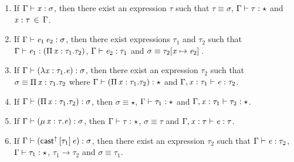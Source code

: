 \begin{lem}\label{lem:appendix:gen}
$\quad$
\begin{enumerate}[(1)]
	\item If $\Gamma  \vdash  \mathit{x}  :  \sigma$, then there exist an expression $\tau$ such that $\tau  \equiv  \sigma$, $\Gamma  \vdash  \tau  :  \star$ and $\mathit{x}  :  \tau \, \in \, \Gamma$.
	\item If $\Gamma  \vdash  \mathit{e_{{\mathrm{1}}}} \, \mathit{e_{{\mathrm{2}}}}  :  \sigma$, then there exist expressions $\tau_{{\mathrm{1}}}$ and $\tau_{{\mathrm{2}}}$ such that $\Gamma  \vdash  \mathit{e_{{\mathrm{1}}}}  :  (  \Pi \, \mathit{x}  :  \tau_{{\mathrm{1}}}  .  \tau_{{\mathrm{2}}}  )$, $\Gamma  \vdash  \mathit{e_{{\mathrm{2}}}}  :  \tau_{{\mathrm{1}}}$ and $\sigma  \equiv  \tau_{{\mathrm{2}}}  [  \mathit{x}  \mapsto  \mathit{e_{{\mathrm{2}}}}  ] \,$.
	\item If $\Gamma  \vdash  (  \lambda  \mathit{x}  :  \tau_{{\mathrm{1}}}  .  \mathit{e}  )  :  \sigma$, then there exist an expression $\tau_{{\mathrm{2}}}$ such that $\sigma  \equiv  \Pi \, \mathit{x}  :  \tau_{{\mathrm{1}}}  .  \tau_{{\mathrm{2}}}$ where $\Gamma  \vdash  (  \Pi \, \mathit{x}  :  \tau_{{\mathrm{1}}}  .  \tau_{{\mathrm{2}}}  )  :  \star$ and $\Gamma  ,  \mathit{x}  :  \tau_{{\mathrm{1}}}  \vdash  \mathit{e}  :  \tau_{{\mathrm{2}}}$.
    \item If $\Gamma  \vdash  (  \Pi \, \mathit{x}  :  \tau_{{\mathrm{1}}}  .  \tau_{{\mathrm{2}}}  )  :  \sigma$, then $\sigma  \equiv  \star$, $\Gamma  \vdash  \tau_{{\mathrm{1}}}  :  \star$ and $\Gamma  ,  \mathit{x}  :  \tau_{{\mathrm{1}}}  \vdash  \tau_{{\mathrm{2}}}  :  \star$.
	\item If $\Gamma  \vdash  (  \mu \, \mathit{x}  :  \tau  .  \mathit{e}  )  :  \sigma$, then $\Gamma  \vdash  \tau  :  \star$, $\sigma  \equiv  \tau$ and $\Gamma  ,  \mathit{x}  :  \tau  \vdash  \mathit{e}  :  \tau$.
	\item If $\Gamma  \vdash  (  \mathsf{cast}^{\uparrow} \, [  \tau_{{\mathrm{1}}}  ] \,  \mathit{e}  )  :  \sigma$, then there exist an expression $\tau_{{\mathrm{2}}}$ such that $\Gamma  \vdash  \mathit{e}  :  \tau_{{\mathrm{2}}}$, $\Gamma  \vdash  \tau_{{\mathrm{1}}}  :  \star$, $\tau_{{\mathrm{1}}}  \longrightarrow  \tau_{{\mathrm{2}}}$ and $\sigma  \equiv  \tau_{{\mathrm{1}}}$.

\end{enumerate}
\end{lem}
